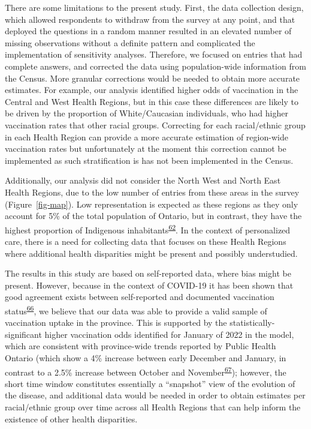 \documentclass[
  letterpaper,
  DIV=11,
  numbers=noendperiod]{scrartcl}
\begin{document}
There are some limitations to the present study. First, the data
collection design, which allowed respondents to withdraw from the survey
at any point, and that deployed the questions in a random manner
resulted in an elevated number of missing observations without a
definite pattern and complicated the implementation of sensitivity
analyses. Therefore, we focused on entries that had complete answers,
and corrected the data using population-wide information from the
Census. More granular corrections would be needed to obtain more
accurate estimates. For example, our analysis identified higher odds of
vaccination in the Central and West Health Regions, but in this case
these differences are likely to be driven by the proportion of
White/Caucasian individuals, who had higher vaccination rates that other
racial groups. Correcting for each racial/ethnic group in each Health
Region can provide a more accurate estimation of region-wide vaccination
rates but unfortunately at the moment this correction cannot be
implemented as such stratification is has not been implemented in the
Census.

Additionally, our analysis did not consider the North West and North
East Health Regions, due to the low number of entries from these areas
in the survey (Figure~\ref{fig-map}). Low representation is expected as
these regions as they only account for 5\% of the total population of
Ontario, but in contrast, they have the highest proportion of Indigenous
inhabitants\textsuperscript{\protect\hyperlink{ref-ontariohealth}{62}}.
In the context of personalized care, there is a need for collecting data
that focuses on these Health Regions where additional health disparities
might be present and possibly understudied.

The results in this study are based on self-reported data, where bias
might be present. However, because in the context of COVID-19 it has
been shown that good agreement exists between self-reported and
documented vaccination
status\textsuperscript{\protect\hyperlink{ref-stephenson2022}{66}}, we
believe that our data was able to provide a valid sample of vaccination
uptake in the province. This is supported by the
statistically-significant higher vaccination odds identified for January
of 2022 in the model, which are consistent with province-wide trends
reported by Public Health Ontario (which show a 4\% increase between
early December and January, in contrast to a 2.5\% increase between
October and
November\textsuperscript{\protect\hyperlink{ref-ontario-covid}{67}});
however, the short time window constitutes essentially a ``snapshot''
view of the evolution of the disease, and additional data would be
needed in order to obtain estimates per racial/ethnic group over time
across all Health Regions that can help inform the existence of other
health disparities.
\end{document}
